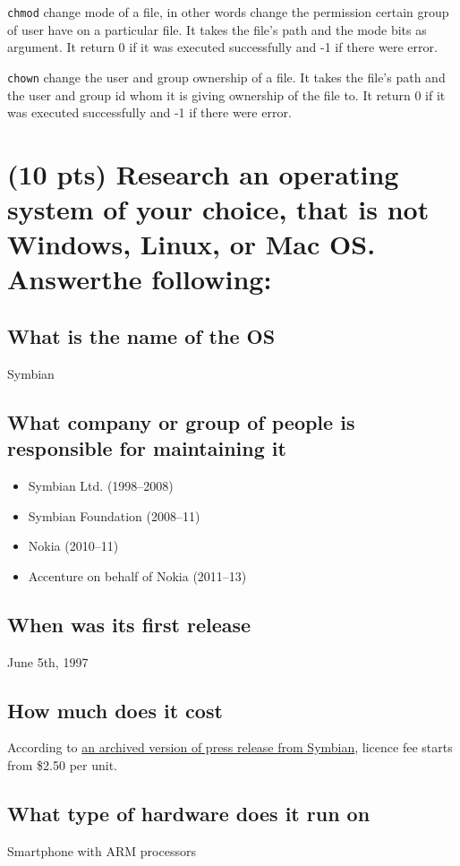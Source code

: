 \documentclass{article}
\begin{document}
\texttt{chmod} change mode of a file, in other words change the permission certain group of user have on a particular file. It takes the file's path and the mode bits as argument. It return 0 if it was executed successfully and -1 if there were error.

\texttt{chown} change the user and group ownership of a file. It takes the file's path and the user and group id whom it is giving ownership of the file to.  It return 0 if it was executed successfully and -1 if there were error.

\newpage

\section{(10 pts) Research an operating system of your choice, that is not Windows, Linux, or Mac OS. Answerthe following:}
\subsection{What is the name of the OS}
Symbian

\subsection{What company or group of people is responsible for maintaining it}
\begin{itemize}
  \item Symbian Ltd. (1998–2008)
  \item Symbian Foundation (2008–11)
  \item Nokia (2010–11)
  \item Accenture on behalf of Nokia (2011–13)
\end{itemize}


\subsection{When was its first release}
June 5th, 1997

\subsection{How much does it cost}
According to \href{https://web.archive.org/web/20060318221211/http://www.symbian.com/news/pr/2006/pr20063401.html}{an archived version of press release from Symbian}, licence fee starts from \$2.50 per unit. 

\subsection{What type of hardware does it run on}
Smartphone with ARM processors
\end{document}
